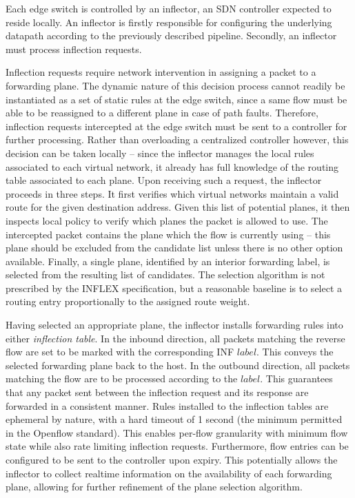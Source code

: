Each edge switch is controlled by an inflector, an \ac{SDN} controller expected to reside locally.
An inflector is firstly responsible for configuring the underlying datapath according to the previously described pipeline.
Secondly, an inflector must process inflection requests.

Inflection requests require network intervention in assigning a packet to a forwarding plane.
The dynamic nature of this decision process cannot readily be instantiated as a set of static rules at the edge switch, since a same flow must be able to be reassigned to a different plane in case of path faults.
Therefore, inflection requests intercepted at the edge switch must be sent to a controller for further processing.
Rather than overloading a centralized controller however, this decision can be taken locally -- since the inflector manages the local rules associated to each virtual network, it already has full knowledge of the routing table associated to each plane.
Upon receiving such a request, the inflector proceeds in three steps.
It first verifies which virtual networks maintain a valid route for the given destination address.
Given this list of potential planes, it then inspects local policy to verify which planes the packet is allowed to use.
The intercepted packet contains the plane which the flow is currently using -- this plane should be excluded from the candidate list unless there is no other option available.
Finally, a single plane, identified by an interior forwarding label, is selected from the resulting list of candidates.
The selection algorithm is not prescribed by the INFLEX specification, but a reasonable baseline is to select a routing entry proportionally to the assigned route weight.

Having selected an appropriate plane, the inflector installs forwarding rules into either \emph{inflection table}.
In the inbound direction, all packets matching the reverse flow are set to be marked with the corresponding \ac{INF} $label$.
This conveys the selected forwarding plane back to the host.
In the outbound direction, all packets matching the flow are to be processed according to the $label$.
This guarantees that any packet sent between the inflection request and its response are forwarded in a consistent manner.
Rules installed to the inflection tables are ephemeral by nature, with a hard timeout of 1 second (the minimum permitted in the Openflow standard).
This enables per-flow granularity with minimum flow state while also rate limiting inflection requests.
Furthermore, flow entries can be configured to be sent to the controller upon expiry.
This potentially allows the inflector to collect realtime information on the availability of each forwarding plane, allowing for further refinement of the plane selection algorithm.
